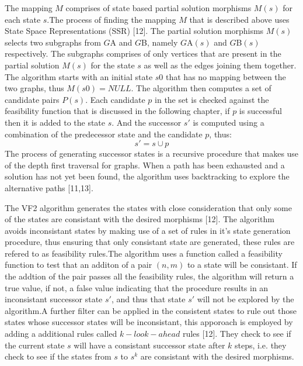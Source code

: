 The mapping $M$ comprises of state based partial solution morphisms $M(s)$ for each state $s$.The process of finding the mapping $M$ that is described above uses State Space Representations (SSR) [12].
The partial solution morphisms $M(s)$ selects two subgraphs from $G${\tiny A} and $G${\tiny B}, namely $G${\tiny A}$(s)$ and $G${\tiny B}$(s)$ respectively. The subgraphs comprises of only vertices that are present in the partial solution $M(s)$ for the state $s$ as well as the edges joining them together.\newline\newline
The algorithm starts with an initial state $s0$ that has no mapping between the two graphs, thus $M(s0)= NULL$. The algorithm then computes a set of candidate pairs $P(s)$. Each candidate $p$ in the set is checked against the feasibility function that is discussed in the following chapter, if $p$ is successful then it is added to the state $s$. And the successor $s'$ is computed using a combination of the predecessor state and the candidate $p$, thus:
	\begin{equation}
		s' = s \cup p
	\end{equation}
The process of generating successor states is a recursive procedure that makes use of the depth first traversal for graphs. When a path has been 
exhausted and a solution has not yet been found, the algorithm uses backtracking to explore the alternative paths [11,13]. \newpage

The VF2 algorithm generates the states with close consideration that only some of the states are consistant with the desired morphisms [12]. The algorithm avoids inconsistant states by making use of a set of rules in it's state generation procedure, thus ensuring that only consistant state are generated, these rules are refered to as feasibility rules.\newline\newline The algorithm uses a function called a feasibility function to test that an additon of a pair $(n,m)$ to a state will be consistant. If the addtion of the pair passes all the feasibility rules, the algorithm will return a true value, if not, a false value indicating that the procedure results in an inconsistant successor  state $s'$, and thus that state $s'$ will not be explored by the algorithm.\newline\newline A further filter can be applied in the consistent states to rule out those states whose successor states will be inconsistant, this apporoach is employed by adding a additional rules called $k-look-ahead$ rules [12]. They check to see if the current state $s$ will have a consistant successor state after $k$ steps, i.e. they check to see if the states from $s$ to $s^k$ are consistant with the desired morphisms.

